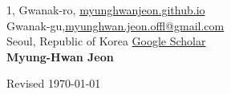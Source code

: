 \documentclass{cv} %
\begin{document}
1, Gwanak-ro,  \hfill \href{https://myunghwanjeon.github.io/}{myunghwanjeon.github.io}\\
Gwanak-gu,\hfill \href{mailto:myunghwan.jeon.offl@gmail.com}{myunghwan.jeon.offl@gmail.com}\\
Seoul, Republic of Korea \hfill \href{https://scholar.google.com/citations?user=ivOqySYAAAAJ}{Google Scholar} \\

\hfil{\namesize\bf Myung-Hwan Jeon}\hfil

\vspace{-3mm}



\clearpage










\vspace{0.5in}
\hfill Revised \today
\end{document}
